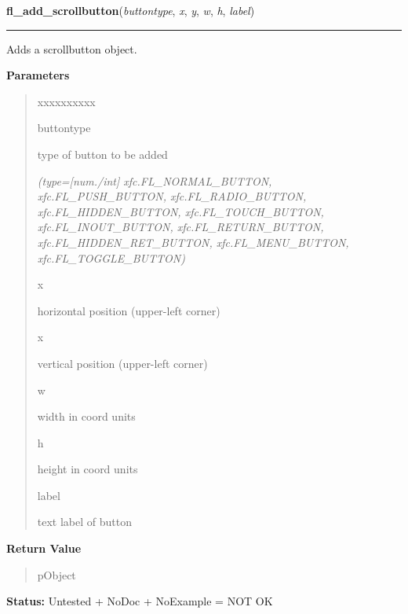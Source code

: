 \hspace{.8\funcindent}\begin{boxedminipage}{\funcwidth}

    \raggedright \textbf{fl\_add\_scrollbutton}(\textit{buttontype}, \textit{x}, \textit{y}, \textit{w}, \textit{h}, \textit{label})

    \vspace{-1.5ex}

    \rule{\textwidth}{0.5\fboxrule}
\setlength{\parskip}{2ex}
    Adds a scrollbutton object.

\setlength{\parskip}{1ex}
      \textbf{Parameters}
      \vspace{-1ex}

      \begin{quote}
        \begin{Ventry}{xxxxxxxxxx}

          \item[buttontype]

          type of button to be added

            {\it (type=[num./int] xfc.FL\_NORMAL\_BUTTON, xfc.FL\_PUSH\_BUTTON, 
xfc.FL\_RADIO\_BUTTON, xfc.FL\_HIDDEN\_BUTTON, xfc.FL\_TOUCH\_BUTTON, 
xfc.FL\_INOUT\_BUTTON, xfc.FL\_RETURN\_BUTTON, xfc.FL\_HIDDEN\_RET\_BUTTON,
xfc.FL\_MENU\_BUTTON, xfc.FL\_TOGGLE\_BUTTON)}

          \item[x]

          horizontal position (upper-left corner)

          \item[x]

          vertical position (upper-left corner)

          \item[w]

          width in coord units

          \item[h]

          height in coord units

          \item[label]

          text label of button

        \end{Ventry}

      \end{quote}

      \textbf{Return Value}
    \vspace{-1ex}

      \begin{quote}
      pObject

      \end{quote}

\textbf{Status:} Untested + NoDoc + NoExample = NOT OK



    \end{boxedminipage}

